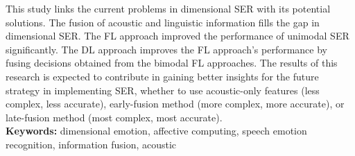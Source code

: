 This study links the current problems in dimensional SER with its potential
solutions. The fusion of acoustic and linguistic information fills the gap in
dimensional SER. The FL approach improved the performance of unimodal SER
significantly. The DL approach improves the FL approach's performance by fusing
decisions obtained from the bimodal FL approaches. The results of this research
is expected to contribute in gaining better insights for the future strategy in
implementing SER, whether to use acoustic-only features (less complex, less
accurate), early-fusion method (more complex, more accurate), or
late-fusion method (most complex, most accurate). \\

\noindent \textbf{Keywords:} dimensional emotion, affective computing, speech
emotion recognition, information fusion, acoustic
